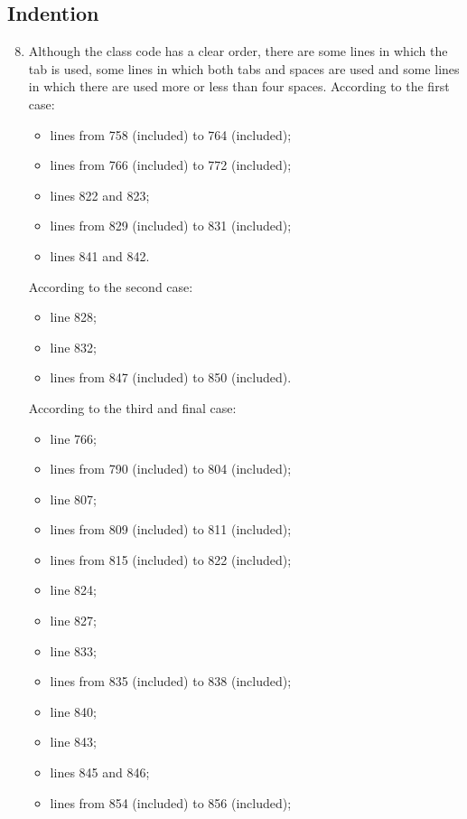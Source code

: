 \subsection{Indention}
\begin{enumerate}
	\setcounter{enumi}{7}
	\item Although the class code has a clear order, there are some lines in which the tab is used, some lines in which both tabs and spaces are used and some lines in which there are used more or less than four spaces. According to the first case:
	    \begin{itemize}
	        \item lines from 758 (included) to 764 (included);
	        \item lines from 766 (included) to 772 (included);
	        \item lines 822 and 823;
	        \item lines from 829 (included) to 831 (included);
	        \item lines 841 and 842.
	    \end{itemize}
	According to the second case:
	    \begin{itemize}
	        \item line 828;
	        \item line 832;
	        \item lines from 847 (included) to 850 (included).
	    \end{itemize}
	According to the third and final case:
	    \begin{itemize}
	        \item line 766;
	        \item lines from 790 (included) to 804 (included);
	        \item line 807;
	        \item lines from 809 (included) to 811 (included);
	        \item lines from 815 (included) to 822 (included);
	        \item line 824;
	        \item line 827;
		    \item line 833;
		    \item lines from 835 (included) to 838 (included);
		    \item line 840;
		    \item line 843;
		    \item lines 845 and 846;
		    \item lines from 854 (included) to 856 (included);

\end{itemize}
\end{enumerate}
